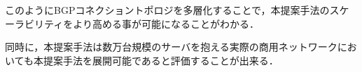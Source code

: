 このようにBGPコネクショントポロジを多層化することで，本提案手法のスケーラビリティをより高める事が可能になることがわかる．

同時に，本提案手法は数万台規模のサーバを抱える実際の商用ネットワークにおいても本提案手法を展開可能であると評価することが出来る．





